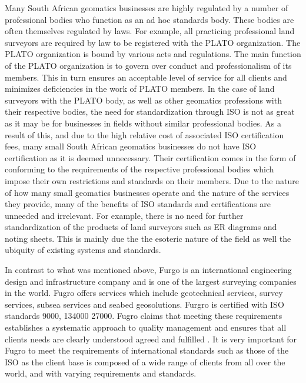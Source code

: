 \documentclass[11pt,a4paper]{article}
\begin{document}
Many South African geomatics businesses are highly regulated by a number of professional bodies who function as an ad hoc standards body. These bodies are often themselves regulated by laws. For example, all practicing professional land surveyors are required by law to be registered with the PLATO organization. The PLATO organization is bound by various acts and regulations. The main function of the PLATO organization is to govern over conduct and professionalism of its members. This in turn ensures an acceptable level of service for all clients and minimizes deficiencies in the work of PLATO members. In the case of land surveyors with the PLATO body, as well as other geomatics professions with their respective bodies, the need for standardization through ISO is not as great as it may be for businesses in fields without similar professional bodies. As a result of this, and due to the high relative cost of associated ISO certification fees, many small South African geomatics businesses do not have ISO certification as it is deemed unnecessary. Their certification comes in the form of conforming to the requirements of the respective professional bodies which impose their own restrictions and standards on their members. Due to the nature of how many small 
geomatics businesses operate and the nature of the services they provide, many of the benefits of ISO standards and certifications are unneeded and irrelevant. For example, there is no need for further standardization of the products of land surveyors such as ER diagrams and noting sheets. This is mainly due the the esoteric nature of the field as well the ubiquity of existing systems and standards. \cite{_south_????}

\vspace{5mm}

In contrast to what was mentioned above, Furgo is an international engineering design and infrastructure company and is one of the largest surveying companies in the world. Fugro offers services which include geotechnical services, survey services, subsea services and seabed geosolutions. Furgro is certified with ISO standards 9000, 134000 27000. Fugro claims that meeting these requirements establishes a systematic approach to quality management and ensures that all clients needs are clearly understood agreed and fulfilled \cite{_iso_????-1}. It is very important for Fugro to meet the requirements of international standards such as those of the ISO as the client base is composed of a wide range of clients from all over the world, and with varying requirements and standards.
\end{document}
